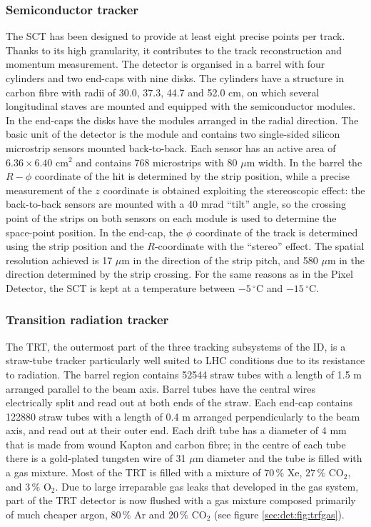 \subsubsection{Semiconductor tracker}

The SCT has been designed to provide at least eight precise points per track. Thanks to its high granularity, it contributes to the track reconstruction and momentum measurement. The detector is organised in a barrel with four cylinders and two end-caps with nine disks. The cylinders have a structure in carbon fibre with radii of 30.0, 37.3, 44.7 and 52.0 cm, on which several longitudinal staves are mounted and equipped with the semiconductor modules. In the end-caps the disks have the modules arranged in the radial direction. The basic unit of the detector is the module and contains two single-sided silicon microstrip sensors mounted back-to-back. Each sensor has an active area of $6.36\times6.40$ cm$^{2}$ and contains 768 microstrips with 80 $\mu$m width. In the barrel the $R-\phi$ coordinate of the hit is determined by the strip position, while a precise measurement of the $z$ coordinate is obtained exploiting the stereoscopic effect: the back-to-back sensors are mounted with a 40 mrad ``tilt'' angle, so the crossing point of the strips on both sensors on each module is used to determine the space-point position. In the end-cap, the $\phi$ coordinate of the track is determined using the strip position and the $R$-coordinate with the ``stereo'' effect. The spatial resolution achieved is 17 $\mu$m in the direction of the strip pitch, and 580 $\mu$m in the direction determined by the strip crossing. For the same reasons as in the Pixel Detector, the SCT is kept at a temperature between $-5\,^{\circ}\mathrm{C}$ and $-15\,^{\circ}\mathrm{C}$.

\subsubsection{Transition radiation tracker}
The TRT, the outermost part of the three tracking subsystems of the ID, is a straw-tube tracker particularly well suited to LHC conditions due to its resistance to radiation. The barrel region contains 52544 straw tubes with a length of 1.5 m arranged parallel to the beam axis. Barrel tubes have the central wires electrically split and read out at both ends of the straw. Each end-cap contains 122880 straw tubes with a length of 0.4 m arranged perpendicularly to the beam axis, and read out at their outer end. Each drift tube has a diameter of 4 mm that is made from wound Kapton and carbon fibre; in the centre of each tube there is a gold-plated tungsten wire of 31 $\mu$m diameter and the tube is filled with a gas mixture. Most of the TRT is filled with a mixture of $70\,\%$ Xe, $27\,\%$ CO$_{2}$, and $3\,\%$ O$_{2}$. Due to large irreparable gas leaks that developed in the gas system, part of the TRT detector is now flushed with a gas mixture composed primarily of much cheaper argon, $80\,\%$ Ar and $20\,\%$ CO$_{2}$ (see figure \ref{sec:det:fig:trfgas}).

